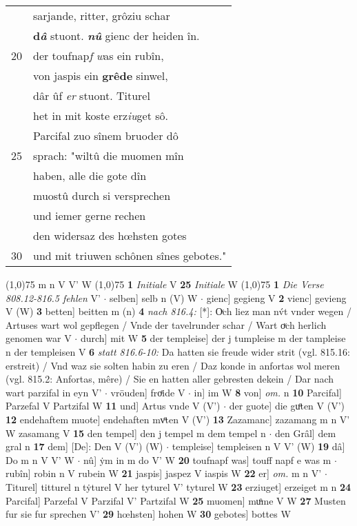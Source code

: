 \documentclass[8pt,a4paper,notitlepage]{article}
\begin{document}
\begin{table}[ht]
\begin{minipage}[t]{0.5\linewidth}
\begin{tabular}{rl}
 & sarjande, ritter, grôziu schar\\ 
 & \textbf{d\textit{â}} stuont. \textit{\textbf{nû}} gienc der heiden în.\\ 
20 & der toufnap\textit{f} \textit{w}as ein rubîn,\\ 
 & von jaspis ein \textbf{grêde} sinwel,\\ 
 & dâr ûf \textit{er} stuont. Titurel\\ 
 & het in mit koste erz\textit{iu}get sô.\\ 
 & Parcifal zuo sînem bruoder dô\\ 
25 & sprach: "wiltû die muomen mîn\\ 
 & haben, alle die gote dîn\\ 
 & muostû durch si versprechen\\ 
 & und iemer gerne rechen\\ 
 & den widersaz des hœhsten gotes\\ 
30 & und mit triuwen schônen sînes gebotes."\\ 
\end{tabular}
\scriptsize
\line(1,0){75} \newline
m n V V' W \newline
\line(1,0){75} \newline
\textbf{1} \textit{Initiale} V  \textbf{25} \textit{Initiale} W  \newline
\line(1,0){75} \newline
\textbf{1} \textit{Die Verse 808.12-816.5 fehlen} V'   $\cdot$ selben] selb n (V) W  $\cdot$ gienc] gegieng V \textbf{2} vienc] gevieng V (W) \textbf{3} betten] beitten m (n) \textbf{4} \textit{nach 816.4:} [*]: Oͮch liez man nv́t vnder wegen / Artuses wart wol gepflegen / Vnde der tavelrunder schar / Wart oͮch herlich genomen war V   $\cdot$ durch] mit W \textbf{5} der templeise] der j tumpleise m der tampleise n der templeisen V \textbf{6} \textit{statt 816.6-10:} Da hatten sie freude wider strit (vgl. 815.16: erstreit) / Vnd waz sie solten habin zu eren / Daz konde in anfortas wol meren (vgl. 815.2: Anfortas, mêre) / Sie en hatten aller gebresten dekein / Dar nach wart parzifal in eyn V'   $\cdot$ vröuden] froͤide V  $\cdot$ in] im W \textbf{8} von] \textit{om.} n \textbf{10} Parcifal] Parzefal V Partzifal W \textbf{11} und] Artus vnde V (V')  $\cdot$ der guote] die guͦten V (V') \textbf{12} endehaftem muote] endehaften mvͦten V (V') \textbf{13} Zazamanc] zazamang m n V' W zasamang V \textbf{15} den tempel] den j tempel m dem tempel n  $\cdot$ den Grâl] dem gral n \textbf{17} dem] [De]: Den V (V') (W)  $\cdot$ templeise] templeisen n V V' (W) \textbf{19} dâ] Do m n V V' W  $\cdot$ nû] ẏm in m do V' W \textbf{20} toufnapf was] touff napf e was m  $\cdot$ rubîn] robin n V rubein W \textbf{21} jaspis] jaspez V iaspis W \textbf{22} er] \textit{om.} m n V'  $\cdot$ Titurel] titturel n tẏturel V her tyturel V' tyturel W \textbf{23} erziuget] erzeiget m n \textbf{24} Parcifal] Parzefal V Parzifal V' Partzifal W \textbf{25} muomen] muͦme V W \textbf{27} Musten fur sie fur sprechen V' \textbf{29} hœhsten] hohen W \textbf{30} gebotes] bottes W \newline
\end{minipage}
\end{table}
\end{document}
